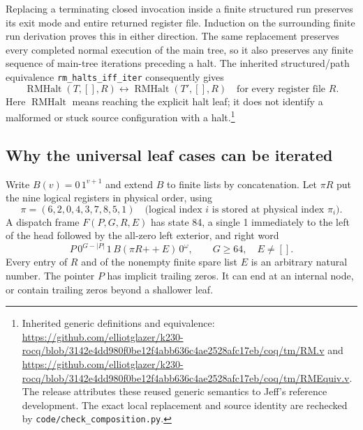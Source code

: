 Replacing a terminating closed invocation inside a finite structured run
preserves its exit mode and entire returned register file.  Induction on
the surrounding finite run derivation proves this in either direction.
The same replacement preserves every completed normal execution of the
main tree, so it also preserves any finite sequence of main-tree
iterations preceding a halt.  The inherited structured/path equivalence
\texttt{rm\_halts\_iff\_iter} consequently gives
\begin{equation}
 \operatorname{RMHalt}(T,[],R)
       \longleftrightarrow\operatorname{RMHalt}(T',[],R)
 \quad\text{for every register file }R.
 \label{eq:k228-source-equivalence}
\end{equation}
Here $\operatorname{RMHalt}$ means reaching the explicit halt leaf;
it does not identify a malformed or stuck source configuration with a
halt.\footnote{Inherited generic definitions and equivalence:
\url{https://github.com/elliotglazer/k230-rocq/blob/3142e4dd980f0be12f4abb636c4ae2528afc17eb/coq/tm/RM.v}
and
\url{https://github.com/elliotglazer/k230-rocq/blob/3142e4dd980f0be12f4abb636c4ae2528afc17eb/coq/tm/RMEquiv.v}.
The release attributes these reused generic semantics to Jeff's reference
development.  The exact local replacement and source identity are
rechecked by \texttt{code/check\_composition.py}.}

\subsection{Why the universal leaf cases can be iterated}

Write $B(v)=0\,1^{v+1}$ and extend $B$ to finite lists by concatenation.
Let $\pi R$ put the nine logical registers in physical order, using
\[
        \pi=(6,2,0,4,3,7,8,5,1)
        \quad\text{(logical index $i$ is stored at physical index $\pi_i$).}
\]
A dispatch frame $F(P,G,R,E)$ has state 84, a single 1 immediately to
the left of the head followed by the all-zero left exterior, and right word
\begin{equation}
        P\,0^{G-|P|}\,1\,B(\pi R\mathbin{+\!+}E)\,0^\omega,
        \qquad G\ge64,\quad E\ne[].
 \label{eq:k228-frame}
\end{equation}
Every entry of $R$ and of the nonempty finite spare list $E$ is an arbitrary
natural number.  The pointer $P$ has implicit trailing zeros.  It can end
at an internal node, or contain trailing zeros beyond a shallower leaf.

